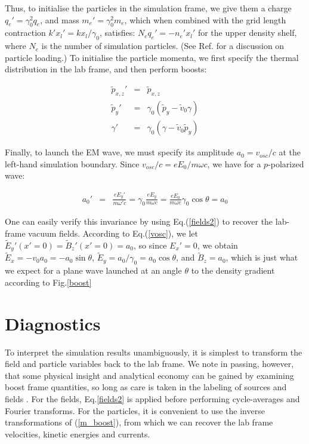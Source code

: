 \documentclass[11pt]{article}
\def\bea{\begin{eqnarray}}
\def\eea{\end{eqnarray}}
\begin{document}
Thus, to initialise the particles in the simulation frame, we give them a
charge $q_e' = \gamma_0^2 q_e$, and mass $m_e' = \gamma_0^2 m_e$, which
when combined with the grid length contraction $k'x_l'= kx_l/\gamma_0$, satisfies: $N_e q_e' = -n_e'x_l'$ for the upper density shelf, where $N_e$ is the number of simulation particles. (See Ref.\cite{birdsall:book} for
a discussion on particle loading.)  To initialise the particle momenta,
we first specify the thermal distribution in the lab frame, and then 
perform boosts:

\bea
\tilde{p}_{x,z}' & = & \tilde{p}_{x,z} \nonumber \\
\tilde{p}_y' & = & \gamma_0(\tilde{p}_y - \tilde{v}_0\gamma) \nonumber \\
\gamma' & = & \gamma_0(\gamma - \tilde{v}_0\tilde{p}_y) \label{m_boost} 
\eea

Finally, to launch the EM wave, we must specify its amplitude 
$a_0 =v_{osc}/c$ at the left-hand simulation boundary.  
Since $v_{osc}/c = eE_0/m\omega c$, we have for a $p$-polarized wave:

\bea
a_0' & = & \frac{eE_y'}{m\omega' c} = \gamma_0\frac{eE_y}{m\omega c}
= \frac{eE_0}{m\omega c}\gamma_0\cos\theta = a_0 \label{vosc} 
\eea

One can easily verify this invariance by using Eq.(\ref{fields2}) to 
recover the lab-frame vacuum fields.  According to Eq.(\ref{vosc}), we let $\tilde{E}_y'(x'=0) = \tilde{B}_z'(x'=0) = a_0$, so since $E_x'= 0$, we obtain
$\tilde{E}_x = -v_0a_0 = -a_0\sin\theta$, $\tilde{E}_y = a_0/\gamma_0 = a_0\cos\theta$, and $\tilde{B}_z = a_0$, which is just what we 
expect for a plane wave launched at an angle $\theta$ to the density 
gradient according to Fig.\ref{boost}

\section{Diagnostics}

To interpret the simulation results unambiguously, it is simplest to 
transform the field and particle variables back to the lab frame.
We note in passing, however, that some physical insight and analytical
economy can be 
gained by examining boost frame quantities, so long as care is taken 
in the labeling of sources and fields \cite{ruhl:pop96}.
For the fields, Eq.\ref{fields2} is applied before performing cycle-averages
and Fourier transforms.  For the particles, it is convenient to use the 
inverse transformations of (\ref{m_boost}), from which we can recover the
lab frame velocities, kinetic energies and currents.
\end{document}
